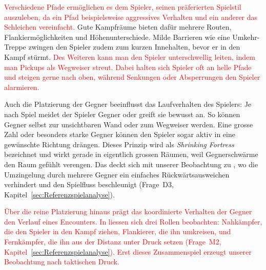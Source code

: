 \documentclass[../Main.tex]{subfiles}
\begin{document}
\textcolor{red}{Verschiedene Pfade ermöglichen es dem Spieler, seinen präferierten Spielstil auszuleben, da ein Pfad beispielsweise aggressives Verhalten und ein anderer das Schleichen vereinfacht.\autocite{gdc_tenprinciples2010}} Gute Kampfräume bieten dafür mehrere Routen, Flankiermöglichkeiten und Höhenunterschiede. Milde Barrieren wie eine Umkehr-Treppe zwingen den Spieler zudem zum kurzen Innehalten, bevor er in den Kampf stürmt.\autocite{gdc_horizonquests2018} \textcolor{red}{Des Weiteren kann man den Spieler unterschwellig leiten, indem man Pickups als Wegweiser streut. Dabei halten sich Spieler oft an helle Pfade und steigen gerne nach oben, während Senkungen oder Absperrungen den Spieler alarmieren.\autocite[240, 245, 251]{rogers2014levelup}}

Auch die Platzierung der Gegner beeinflusst das Laufverhalten des Spielers: Je nach Spiel meidet der Spieler Gegner oder greift sie bewusst an. So können Gegner selbst zur unsichtbaren Wand oder zum Wegweiser werden.\autocite[199]{totten2014architectural} Eine grosse Zahl oder besonders starke Gegner können den Spieler sogar aktiv in eine gewünschte Richtung drängen. Dieses Prinzip wird als \textit{Shrinking Fortress} bezeichnet und wirkt gerade in eigentlich grossen Räumen, weil Gegnerschwärme den Raum gefühlt verengen.\autocite[199--200]{totten2014architectural} Das deckt sich mit unserer Beobachtung zu , wo die Umzingelung durch mehrere Gegner ein einfaches Rückwärtsausweichen verhindert und den Spielfluss beschleunigt (Frage~D3, Kapitel~\ref{sec:Referenzspielanalyse}).

\textcolor{red}{Über die reine Platzierung hinaus prägt das koordinierte Verhalten der Gegner den Verlauf eines Encounters. In  liessen sich drei Rollen beobachten: Nahkämpfer, die den Spieler in den Kampf ziehen, Flankierer, die ihn umkreisen, und Fernkämpfer, die ihn aus der Distanz unter Druck setzen (Frage~M2, Kapitel~\ref{sec:Referenzspielanalyse}). Erst dieses Zusammenspiel erzeugt unserer Beobachtung nach taktischen Druck.}
\end{document}
